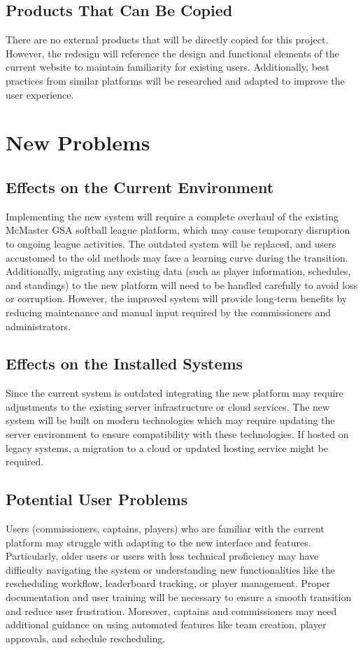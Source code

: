 \documentclass[12pt]{article}
\begin{document}
\subsection{Products That Can Be Copied}
There are no external products that will be directly copied for this project. However, the redesign will reference the design and functional elements of the current website to maintain familiarity for existing users. Additionally, best practices from similar platforms will be researched and adapted to improve the user experience.


\section{New Problems}
\subsection{Effects on the Current Environment}
Implementing the new system will require a complete overhaul of the existing McMaster GSA softball league platform, which may cause temporary disruption to ongoing league activities. The outdated system will be replaced, and users accustomed to the old methods may face a learning curve during the transition. Additionally, migrating any existing data (such as player information, schedules, and standings) to the new platform will need to be handled carefully to avoid loss or corruption. However, the improved system will provide long-term benefits by reducing maintenance and manual input required by the commissioners and administrators. 
\subsection{Effects on the Installed Systems}
Since the current system is outdated integrating the new platform may require adjustments to the existing server infrastructure or cloud services. The new system will be built on modern technologies which may require updating the server environment to ensure compatibility with these technologies. If hosted on legacy systems, a migration to a cloud or updated hosting service might be required.
\subsection{Potential User Problems}
Users (commissioners, captains, players) who are familiar with the current platform may struggle with adapting to the new interface and features. Particularly, older users or users with less technical proficiency may have difficulty navigating the system or understanding new functionalities like the rescheduling workflow, leaderboard tracking, or player management. Proper documentation and user training will be necessary to ensure a smooth transition and reduce user frustration. Moreover, captains and commissioners may need additional guidance on using automated features like team creation, player approvals, and schedule rescheduling.
\end{document}
